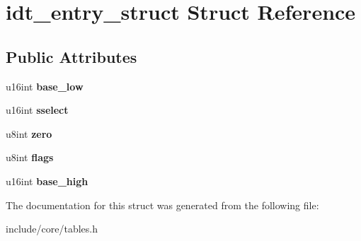 \hypertarget{structidt__entry__struct}{}\section{idt\+\_\+entry\+\_\+struct Struct Reference}
\label{structidt__entry__struct}
\subsection*{Public Attributes}
\begin{DoxyCompactItemize}
\item 
u16int {\bfseries base\+\_\+low}\hypertarget{structidt__entry__struct_aefa75d6bfe07f1f544393b4dbccb3e76}{}\label{structidt__entry__struct_aefa75d6bfe07f1f544393b4dbccb3e76}

\item 
u16int {\bfseries sselect}\hypertarget{structidt__entry__struct_a85254c7df6a612f4a4b3bb470ff3370c}{}\label{structidt__entry__struct_a85254c7df6a612f4a4b3bb470ff3370c}

\item 
u8int {\bfseries zero}\hypertarget{structidt__entry__struct_a0d33c8509ae77d42e680d8d11b4c8035}{}\label{structidt__entry__struct_a0d33c8509ae77d42e680d8d11b4c8035}

\item 
u8int {\bfseries flags}\hypertarget{structidt__entry__struct_a46c92bd8f07d5ff4e379a07b293c46af}{}\label{structidt__entry__struct_a46c92bd8f07d5ff4e379a07b293c46af}

\item 
u16int {\bfseries base\+\_\+high}\hypertarget{structidt__entry__struct_a1c6a29cae5ea9a832cf4261aaa5b43d0}{}\label{structidt__entry__struct_a1c6a29cae5ea9a832cf4261aaa5b43d0}

\end{DoxyCompactItemize}


The documentation for this struct was generated from the following file\+:\begin{DoxyCompactItemize}
\item 
include/core/tables.\+h\end{DoxyCompactItemize}
